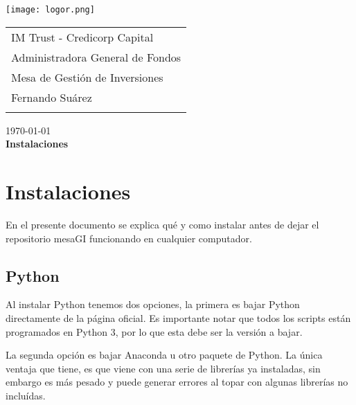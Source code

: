 \documentclass{article}
\begin{document}
\texttt{[image: logor.png]}
\vspace*{-1.55cm}

\hspace*{1.4 cm}
 \hspace*{2.9 cm}
 {\footnotesize
 \begin{tabular}{l}
  \sc IM Trust - Credicorp Capital\\
  \sc Administradora General de Fondos \\
  \sc Mesa de Gestión de Inversiones  \\
  \sc Fernando Suárez  \\
  \vspace{15\baselineskip}\mbox{}
  \vspace{-3mm}\mbox{}
 \end{tabular}
}

 \bigskip

\vspace*{5mm}
\begin{center}
{\today} \\
\vspace{3mm}
{\Large\bf Instalaciones} \\
\vspace{2mm}
\end{center}
\section{Instalaciones}


En el presente documento se explica qué y como instalar antes de dejar el repositorio mesaGI funcionando en cualquier computador.

\subsection{Python}

Al instalar Python tenemos dos opciones, la primera es bajar Python directamente de la página oficial. Es importante notar que todos los scripts están programados en Python 3, por lo que esta debe ser la versión a bajar. 

La segunda opción es bajar Anaconda u otro paquete de Python. La única ventaja que tiene, es que viene con una serie de librerías ya instaladas, sin embargo es más pesado y puede generar errores al topar con algunas librerías no incluídas.
\end{document}
